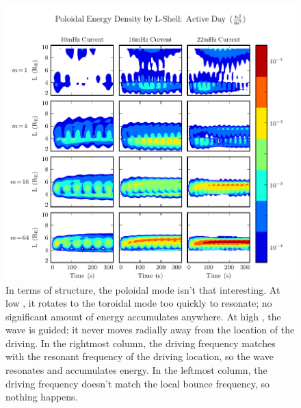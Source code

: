 \begin{figure}[H]
    \centering
    \includegraphics[width=\textwidth]{figures/upollayers_J_1.pdf}
    \caption[Poloidal Energy Density by L-Shell: Active Day]{
      In terms of structure, the poloidal mode isn't that interesting. At low \azm, it rotates to the toroidal mode too quickly to resonate; no significant amount of energy accumulates anywhere. At high \azm, the wave is guided; it never moves radially away from the location of the driving. In the rightmost column, the driving frequency matches with the resonant frequency of the driving location, so the wave resonates and accumulates energy. In the leftmost column, the driving frequency doesn't match the local bounce frequency, so nothing happens. 
    }
    \label{fig_upollayers_J_1}
\end{figure}


